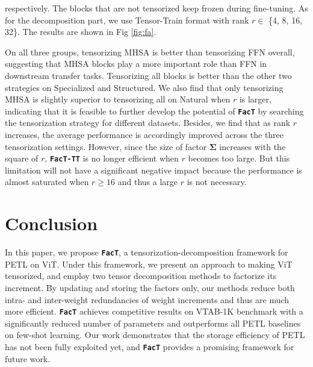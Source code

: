 respectively. The blocks that are not tensorized keep frozen during fine-tuning. As for the decomposition part, we use Tensor-Train format with rank $r\in$  \{4, 8, 16, 32\}. The results are shown in Fig \ref{fig:fa}.

On all three groups, tensorizing MHSA is better than tensorizing FFN overall, suggesting that MHSA blocks play a more important role than FFN in downstream transfer tasks. Tensorizing all blocks is better than the other two strategies on Specialized and Structured. We also find that only tensorizing MHSA is slightly superior to tensorizing all on Natural when $r$ is larger, indicating that it is feasible to further develop the potential of \texttt{\textbf{FacT}} by searching the tensorization strategy for different datasets. Besides, we find that as rank $r$ increases, the average performance is accordingly improved across the three tensorization settings. However, since the size of factor $\boldsymbol{\Sigma}$ increases with the square of $r$, \texttt{\textbf{FacT-TT}} is no longer efficient when $r$ becomes too large. But this limitation will not have a significant negative impact because the performance is almost saturated when $r\geq16$ and thus a large $r$ is not necessary. 

\section{Conclusion}
In this paper, we propose \texttt{\textbf{FacT}}, a tensorization-decomposition framework for PETL on ViT. Under this framework, we present an approach to making ViT tensorized, and employ two tensor decomposition methods to factorize its increment. By updating and storing the factors only, our methods reduce both intra- and inter-weight redundancies of weight increments and thus are much more efficient. \texttt{\textbf{FacT}} achieves competitive results on VTAB-1K benchmark with a significantly reduced number of parameters and outperforms all PETL baselines on few-shot learning. Our work demonstrates that the storage efficiency of PETL has not been fully exploited yet, and \texttt{\textbf{FacT}} provides a promising framework for future work. 


